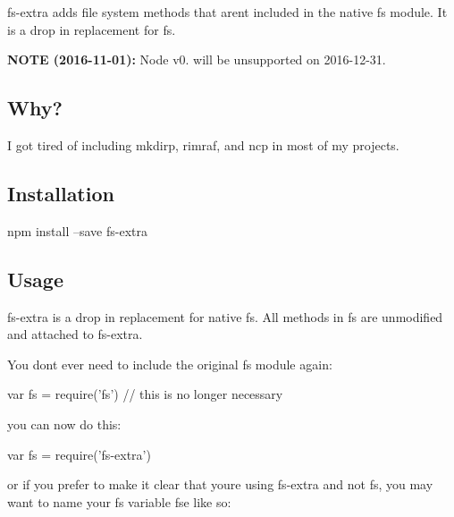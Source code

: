 {\ttfamily fs-\/extra} adds file system methods that aren\textquotesingle{}t included in the native {\ttfamily fs} module. It is a drop in replacement for {\ttfamily fs}.

\href{https://www.npmjs.org/package/fs-extra}{\tt } \href{http://travis-ci.org/jprichardson/node-fs-extra}{\tt } \href{https://ci.appveyor.com/project/jprichardson/node-fs-extra/branch/master}{\tt } \href{https://www.npmjs.org/package/fs-extra}{\tt } \href{https://coveralls.io/r/jprichardson/node-fs-extra}{\tt }

\href{https://github.com/feross/standard}{\tt }

{\bfseries N\+O\+TE (2016-\/11-\/01)\+:} Node v0. will be unsupported on 2016-\/12-\/31.

\subsection*{Why? }

I got tired of including {\ttfamily mkdirp}, {\ttfamily rimraf}, and {\ttfamily ncp} in most of my projects.

\subsection*{Installation }

\begin{DoxyVerb}npm install --save fs-extra
\end{DoxyVerb}


\subsection*{Usage }

{\ttfamily fs-\/extra} is a drop in replacement for native {\ttfamily fs}. All methods in {\ttfamily fs} are unmodified and attached to {\ttfamily fs-\/extra}.

You don\textquotesingle{}t ever need to include the original {\ttfamily fs} module again\+:


\begin{DoxyCode}
var fs = require('fs') // this is no longer necessary
\end{DoxyCode}


you can now do this\+:


\begin{DoxyCode}
var fs = require('fs-extra')
\end{DoxyCode}


or if you prefer to make it clear that you\textquotesingle{}re using {\ttfamily fs-\/extra} and not {\ttfamily fs}, you may want to name your {\ttfamily fs} variable {\ttfamily fse} like so\+:


